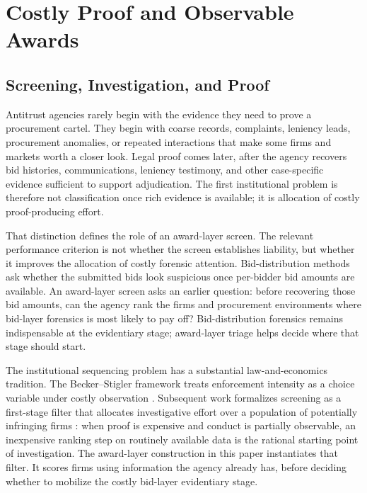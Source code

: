 \section{Costly Proof and Observable Awards}
\label{sec:setting_layers}

\subsection{Screening, Investigation, and Proof}
\label{sec:setting_screening}

Antitrust agencies rarely begin with the evidence they need to
prove a procurement cartel. They begin with coarse records,
complaints, leniency leads, procurement anomalies, or repeated
interactions that make some firms and markets worth a closer
look. Legal proof comes later, after the agency recovers bid
histories, communications, leniency testimony, and other
case-specific evidence sufficient to support adjudication. The
first institutional problem is therefore not classification once
rich evidence is available; it is allocation of costly
proof-producing effort.

That distinction defines the role of an award-layer screen. The
relevant performance criterion is not whether the screen
establishes liability, but whether it improves the allocation of
costly forensic attention. Bid-distribution methods ask whether
the submitted bids look suspicious once per-bidder bid amounts
are available. An award-layer screen asks an earlier question:
before recovering those bid amounts, can the agency rank the
firms and procurement environments where bid-layer forensics is
most likely to pay off? Bid-distribution forensics remains
indispensable at the evidentiary stage; award-layer triage helps
decide where that stage should start.

The institutional sequencing problem has a substantial
law-and-economics tradition. The Becker--Stigler framework
treats enforcement intensity as a choice variable under costly
observation \citep{becker1968crime,stigler1970optimum}.
Subsequent work formalizes screening as a first-stage filter
that allocates investigative effort over a population of
potentially infringing firms
\citep{harrington2008detecting,baker2002case}: when proof is
expensive and conduct is partially observable, an inexpensive
ranking step on routinely available data is the rational
starting point of investigation. The award-layer construction
in this paper instantiates that filter. It scores firms using
information the agency already has, before deciding whether to
mobilize the costly bid-layer evidentiary stage.

